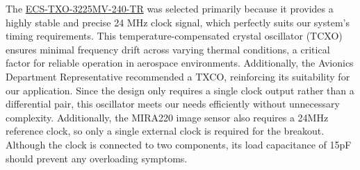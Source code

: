The \href{https://au.mouser.com/ProductDetail/ECS/ECS-TXO-3225MV-240-TR?qs=d0WKAl%252BL4KYXn7UuwSFJGQ%3D%3D&srsltid=AfmBOorOY2wQxS3CEel65bFe57g9eu10yFCWhAAwtVdzP2gFNVWZyZMu}{ECS-TXO-3225MV-240-TR} was selected primarily because it provides a highly stable and precise 24 MHz clock signal, which perfectly suits our system's timing requirements.
This temperature-compensated crystal oscillator (TCXO) ensures minimal frequency drift across varying thermal conditions, a critical factor for reliable operation in aerospace environments.
Additionally, the Avionics Department Representative recommended a TXCO, reinforcing its suitability for our application. Since the design only requires a single clock output rather than a differential pair, this oscillator meets our needs efficiently without unnecessary complexity.
Additionally, the MIRA220 image sensor also requires a 24MHz reference clock, so only a single external clock is required for the breakout. Although the clock is connected to two components, its load capacitance of 15pF should prevent any overloading symptoms.
